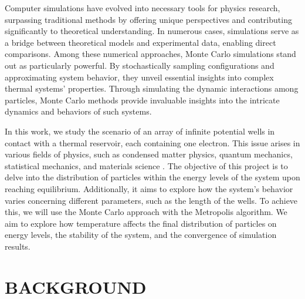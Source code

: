 \documentclass[%
 reprint,
 amsmath,amssymb,
 aps,
]{revtex4-2}
\begin{document}
Computer simulations have evolved into necessary tools for physics research, surpassing traditional methods by offering unique perspectives and contributing significantly to theoretical understanding. In numerous cases, simulations serve as a bridge between theoretical models and experimental data, enabling direct comparisons. Among these numerical approaches, Monte Carlo simulations stand out as particularly powerful. By stochastically sampling configurations and approximating system behavior, they unveil essential insights into complex thermal systems' properties. Through simulating the dynamic interactions among particles, Monte Carlo methods provide invaluable insights into the intricate dynamics and behaviors of such systems.

In this work, we study the scenario of an array of infinite potential wells in contact with a thermal reservoir, each containing one electron. This issue arises in various fields of physics, such as condensed matter physics, quantum mechanics, statistical mechanics, and materials science \cite{shi_optical_2020} \cite{neophytou_nanostructured_2019} \cite{tsatsulnikov_modulation_1997}.
The objective of this project is to delve into the distribution of particles within the energy levels of the system upon reaching equilibrium. Additionally, it aims to explore how the system's behavior varies concerning different parameters, such as the length of the wells. To achieve this, we will use the Monte Carlo approach with the Metropolis algorithm. We aim to explore how temperature affects the final distribution of particles on energy levels, the stability of the system, and the convergence of simulation results.

\section{BACKGROUND}
\end{document}
